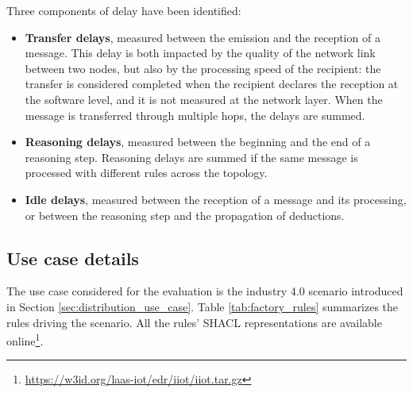 \documentclass{iosart2c}
\begin{document}
Three components of delay have been identified:
\begin{itemize}
	\item \textbf{Transfer delays}, measured between the emission and the reception of a message. This delay is both impacted by the quality of the network link between two nodes, but also by the processing speed of the recipient: the transfer is considered completed when the recipient declares the reception at the software level, and it is not measured at the network layer. 
	When the message is transferred through multiple hops, the delays are summed.
	\item \textbf{Reasoning delays}, measured between the beginning and the end of a reasoning step. 
	Reasoning delays are summed if the same message is processed with different rules across the topology.
	\item \textbf{Idle delays}, measured between the reception of a message and its processing, or between the reasoning step and the propagation of deductions.
\end{itemize}

\subsection{Use case details}
\label{subs:factory_use_case}

The use case considered for the evaluation is the industry 4.0 scenario introduced in Section \textsection \ref{sec:distribution_use_case}.
Table \ref{tab:factory_rules} summarizes the rules driving the scenario. 
All the rules' SHACL representations are available online\footnote{\url{https://w3id.org/laas-iot/edr/iiot/iiot.tar.gz}}.
\end{document}
